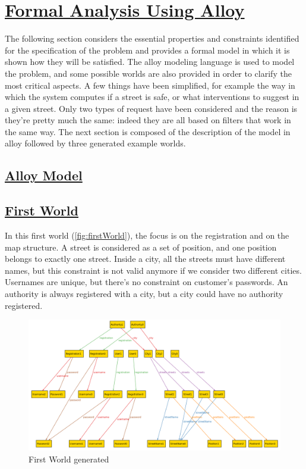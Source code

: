 \section[Formal Analysis Using Alloy]{\hyperlink{toc}{Formal Analysis Using Alloy}}
	\label{sec:formalAnalysisUsingAlloy}
	The following section considers the essential properties and constraints identified for the specification of the problem and provides a formal model in which it is shown how they will be satisfied. The alloy modeling language is used to model the problem, and some possible worlds are also provided in order to clarify the most critical aspects. 
	A few things have been simplified, for example the way in which the system computes if a street is safe, or what interventions to suggest in a given street. Only two types of request have been considered and the reason is they're pretty much the same: indeed they are all based on filters that work in the same way. The next section is composed of the description of the model in alloy followed by three generated example worlds.
	
	\subsection[Alloy Model]{\hyperlink{toc}{Alloy Model}}
	
	
	\subsection[First World]{\hyperlink{toc}{First World}}
	In this first world (\autoref{fig:firstWorld}), the focus is on the registration and on the map structure. 
	A street is considered as a set of position, and one position belongs to exactly one street. Inside a city, all the streets must have different names, but this constraint is not valid anymore if we consider two different cities.
	Usernames are unique, but there's no constraint on customer's passwords.
	An authority is always registered with a city, but a city could have no authority registered.
	
	\begin{figure}[h!]
		\centering
		\includegraphics[scale=0.4, angle=90]{Files/alloy/world1.png}
		\caption{\label{fig:firstWorld}First World generated}
	\end{figure}
	
